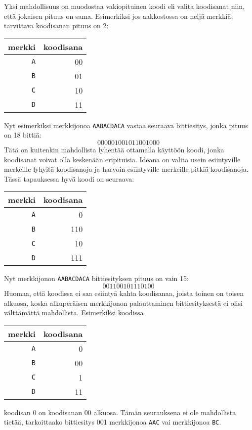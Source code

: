 Yksi mahdollisuus on muodostaa vakiopituinen
koodi eli valita koodisanat niin,
että jokaisen pituus on sama.
Esimerkiksi jos aakkostossa on neljä merkkiä,
tarvittava koodisanan pituus on 2:
\begin{center}
\begin{tabular}{rr}
merkki & koodisana \\
\hline
\texttt{A} & 00 \\
\texttt{B} & 01 \\
\texttt{C} & 10 \\
\texttt{D} & 11 \\
\end{tabular}
\end{center}
Nyt esimerkiksi merkkijonoa \texttt{AABACDACA}
vastaa seuraava bittiesitys, jonka pituus on 18 bittiä:
\[000001001011001000\]
Tätä on kuitenkin mahdollista lyhentää
ottamalla käyttöön koodi, jonka koodisanat voivat
olla keskenään eripituisia.
Ideana on valita usein esiintyville merkeille
lyhyitä koodisanoja ja harvoin esiintyville
merkeille pitkiä koodisanoja.
Tässä tapauksessa hyvä koodi on seuraava:
\begin{center}
\begin{tabular}{rr}
merkki & koodisana \\
\hline
\texttt{A} & 0 \\
\texttt{B} & 110 \\
\texttt{C} & 10 \\
\texttt{D} & 111 \\
\end{tabular}
\end{center}
Nyt merkkijonon \texttt{AABACDACA}
bittiesityksen pituus on vain 15:
\[001100101110100\]
Huomaa, että koodissa ei saa esiintyä kahta koodisanaa,
joista toinen on toisen alkuosa,
koska alkuperäisen merkkijonon palauttaminen
bittiesityksestä ei olisi välttämättä mahdollista.
Esimerkiksi koodissa
\begin{center}
\begin{tabular}{rr}
merkki & koodisana \\
\hline
\texttt{A} & 0 \\
\texttt{B} & 00 \\
\texttt{C} & 1 \\
\texttt{D} & 11 \\
\end{tabular}
\end{center}
koodisan 0 on koodisanan 00 alkuosa.
Tämän seurauksena ei ole mahdollista tietää, tarkoittaako bittiesitys
001 merkkijonoa \texttt{AAC} vai merkkijonoa \texttt{BC}.

